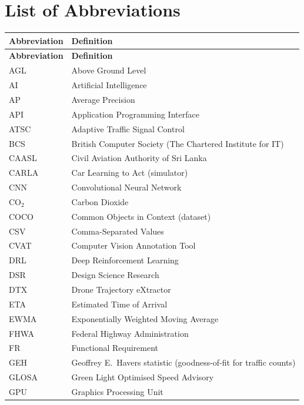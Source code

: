\chapter*{List of Abbreviations}


\renewcommand{\arraystretch}{1.15}
\begin{longtable}{@{}p{}p{}@{}}
\toprule
\textbf{Abbreviation} & \textbf{Definition}\\
\midrule
\endfirsthead
\toprule
\textbf{Abbreviation} & \textbf{Definition}\\
\midrule
\endhead
\bottomrule
\endlastfoot
AGL & Above Ground Level\\
AI & Artificial Intelligence\\
AP & Average Precision\\
API & Application Programming Interface\\
ATSC & Adaptive Traffic Signal Control\\
BCS & British Computer Society (The Chartered Institute for IT)\\
CAASL & Civil Aviation Authority of Sri Lanka\\
CARLA & Car Learning to Act (simulator)\\
CNN & Convolutional Neural Network\\
CO$_2$ & Carbon Dioxide\\
COCO & Common Objects in Context (dataset)\\
CSV & Comma-Separated Values\\
CVAT & Computer Vision Annotation Tool\\
DRL & Deep Reinforcement Learning\\
DSR & Design Science Research\\
DTX & Drone Trajectory eXtractor\\
ETA & Estimated Time of Arrival\\
EWMA & Exponentially Weighted Moving Average\\
FHWA & Federal Highway Administration\\
FR & Functional Requirement\\
GEH & Geoffrey E.\ Havers statistic (goodness-of-fit for traffic counts)\\
GLOSA & Green Light Optimised Speed Advisory\\
GPU & Graphics Processing Unit\\

\end{longtable}
